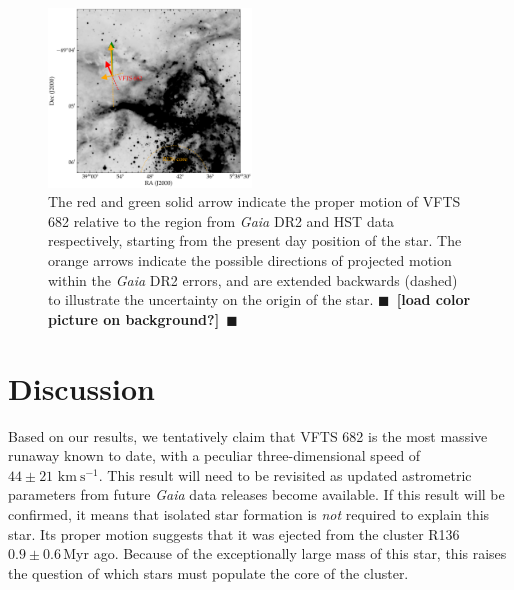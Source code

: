 \documentclass[apjl,twocolumn]{emulateapj}
\newcommand{\todo}[1]{{\large $\blacksquare$~\textbf{\color{red}[#1]}}~$\blacksquare$}
\newcommand{\kms}{{\,\mathrm{km\ s^{-1}}}}
\begin{document}
\begin{figure}[tbp]
  \centering
  \includegraphics[width=0.48\textwidth]{./figures/main_plot_good}  
  \caption{The red and green solid arrow indicate the proper motion of VFTS 682
    relative to the region from \emph{Gaia} DR2 and HST data respectively, starting from the present day position of
    the star. The orange arrows indicate the possible
    directions of projected motion within the \emph{Gaia} DR2 errors, and are extended
    backwards (dashed) to illustrate the uncertainty on the origin of the
    star. \todo{load color picture on background?}}
  
  \label{fig:main}
\end{figure}


\section{Discussion}
\label{sec:discussion}

Based on our results, we tentatively claim that VFTS 682 is the most massive
runaway known to date, with a peculiar three-dimensional speed of
$44\pm21\,\kms$. This result will need to be revisited as updated
astrometric parameters from future \emph{Gaia} data releases become
available. If this result will be confirmed, it means that isolated star formation is
\emph{not} required to explain this star. Its proper motion suggests that it was ejected from the cluster R136
$0.9\pm0.6$\,Myr ago. Because of the exceptionally large mass
of this star, this raises the question of which stars must populate
the core of the cluster.
\end{document}
